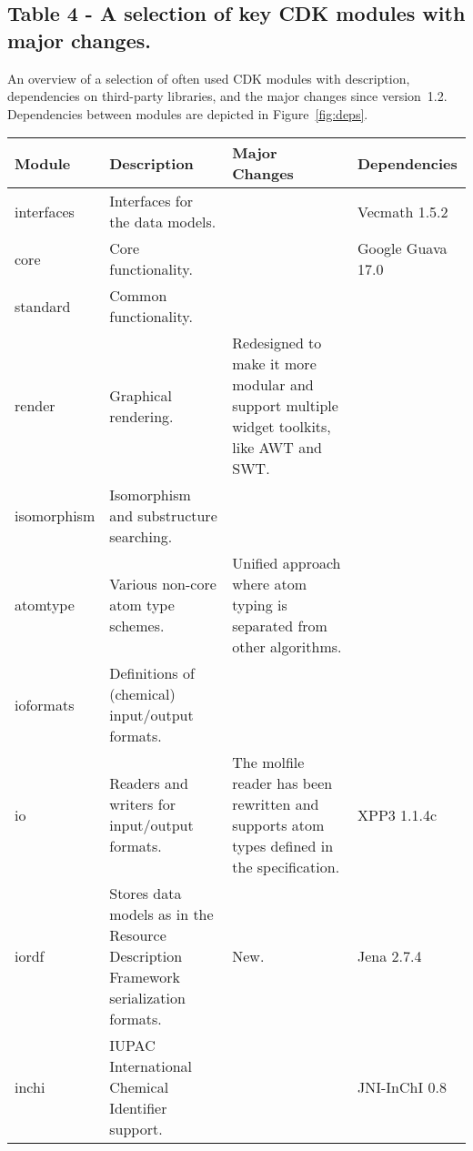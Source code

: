 \documentclass[doublespacing]{bmcart}
\begin{document}
\begin{backmatter}
\newpage
    
      \subsection*{Table 4 - A selection of key CDK modules with major changes.}\label{tab:modules}
  An overview of a selection of often used CDK modules with description,
  dependencies on third-party libraries, and the major changes since
  version~1.2. Dependencies between modules are depicted in Figure~\ref{fig:deps}.
  \baselineskip

    \begin{minipage}{1\textwidth}
    \renewcommand*{\thempfootnote}{\fnsymbol{mpfootnote}}
    \centering
    \begin{tabular}{lp{3cm}p{3cm}l}
  \textbf{Module}            & \textbf{Description}  & \textbf{Major Changes} & \textbf{Dependencies} \\ \hline
  interfaces                 & Interfaces for the data models. & & Vecmath 1.5.2 \\ \hline
  core                       & Core functionality.             & & Google Guava 17.0 \\ \hline %
  standard                   & Common functionality.           & & \\ \hline
  render                     & Graphical rendering.            & Redesigned to make it more modular and support multiple widget toolkits, like AWT and SWT. & \\ \hline
  isomorphism                & Isomorphism and substructure searching. & & \\ \hline
  atomtype                   & Various non-core atom type schemes.     & Unified approach where atom typing is separated from other algorithms. & \\ \hline
  ioformats                  & Definitions of (chemical) input/output formats. & & \\ \hline
  io                         & Readers and writers for input/output formats.  & The molfile reader has been rewritten and supports atom types defined in the specification. & XPP3 1.1.4c \\ \hline
  iordf                      & Stores data models as in the Resource Description Framework serialization formats. & New. & Jena 2.7.4 \\ \hline
  inchi                      & IUPAC International Chemical Identifier support. & & JNI-InChI 0.8~\cite{Spjuth2013}  \\ \hline

\end{tabular}
\end{minipage}
\end{backmatter}
\end{document}

